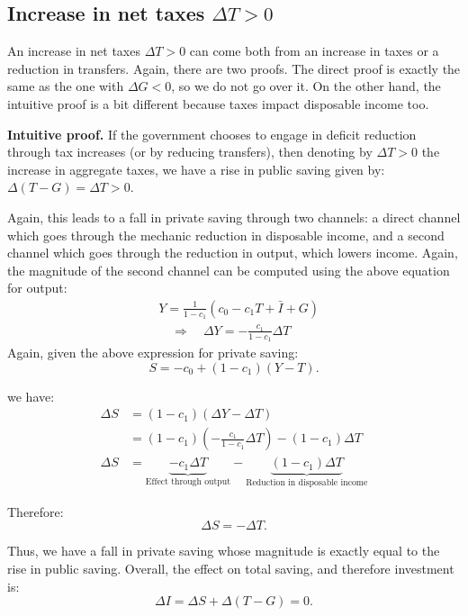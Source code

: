 \documentclass[]{book}
\theoremstyle{definition}
\theoremstyle{definition}
\theoremstyle{definition}
\theoremstyle{remark}
\begin{document}
\subsection{\texorpdfstring{Increase in net taxes
\(\Delta T>0\)}{Increase in net taxes \textbackslash{}Delta T\textgreater{}0}}\label{increase-in-net-taxes-delta-t0}

An increase in net taxes \(\Delta T>0\) can come both from an increase
in taxes or a reduction in transfers. Again, there are two proofs. The
direct proof is exactly the same as the one with \(\Delta G<0\), so we
do not go over it. On the other hand, the intuitive proof is a bit
different because taxes impact disposable income too.

\textbf{Intuitive proof.} If the government chooses to engage in deficit
reduction through tax increases (or by reducing transfers), then
denoting by \(\Delta T>0\) the increase in aggregate taxes, we have a
rise in public saving given by: \(\Delta(T-G)=\Delta T>0\).

Again, this leads to a fall in private saving through two channels: a
direct channel which goes through the mechanic reduction in disposable
income, and a second channel which goes through the reduction in output,
which lowers income. Again, the magnitude of the second channel can be
computed using the above equation for output: \[
\begin{aligned}
&Y=\frac{1}{1-c_{1}}\left(c_{0}-c_{1}T+\bar{I}+G\right)\\
&\quad\Rightarrow\quad\Delta Y=-\frac{c_{1}}{1-c_{1}}\Delta T
\end{aligned}
\] Again, given the above expression for private saving:
\[S=-c_{0}+\left(1-c_{1}\right)\left(Y-T\right).\]

we have: \[
\begin{aligned}
\Delta S    &=(1-c_{1})(\Delta Y-\Delta T)\\
    &=(1-c_{1})\left(-\frac{c_{1}}{1-c_{1}}\Delta T\right)-(1-c_{1})\Delta T\\
\Delta S    &=\underbrace{-c_{1}\Delta T}_{\text{Effect through output}}-\underbrace{(1-c_{1})\Delta T}_{\text{Reduction in disposable income}}
\end{aligned}
\]

Therefore: \[\Delta S=-\Delta T.\]

Thus, we have a fall in private saving whose magnitude is exactly equal
to the rise in public saving. Overall, the effect on total saving, and
therefore investment is: \[\Delta I  =\Delta S+\Delta(T-G)=0.\]
\end{document}
